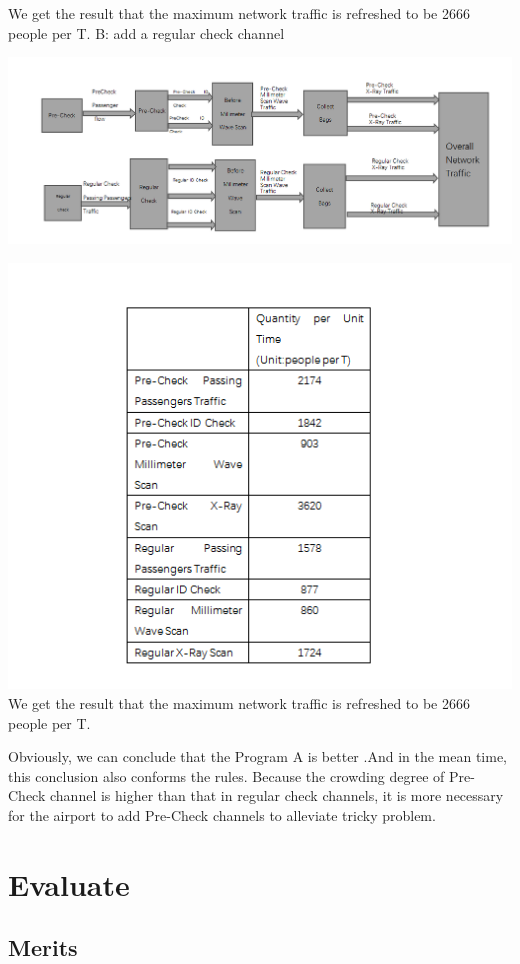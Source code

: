 \documentclass[12pt]{article}
\begin{document}
We get the result that the maximum network traffic is refreshed to be 2666 people per T.
B: add a regular check channel

\includegraphics[width=15cm]{m4.png}

\includegraphics[width=15cm]{p5.png}
We get the result that the maximum network traffic is refreshed to be 2666 people per T.

Obviously, we can conclude that the Program A is better .And in the mean time, this conclusion also conforms the rules. Because the crowding degree of Pre-Check channel is higher than that in regular check channels, it is more necessary for the airport to add Pre-Check channels to alleviate tricky problem.
\section{Evaluate}


\subsection{Merits}
\end{document}
